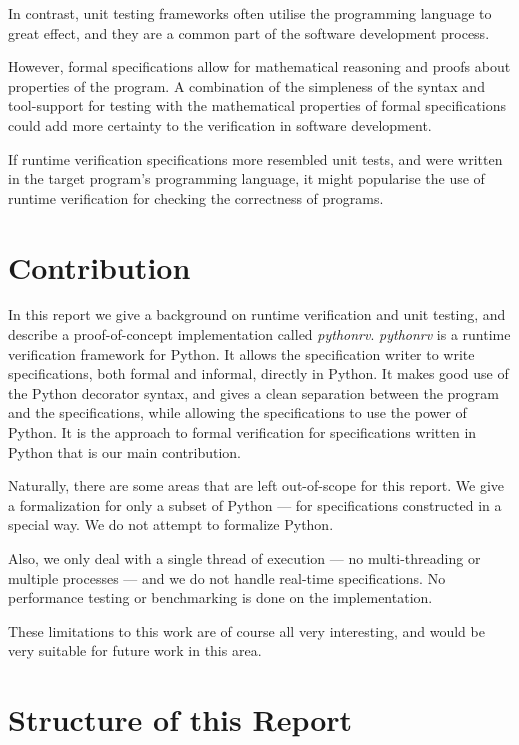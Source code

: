 \documentclass[a4paper,11pt]{kth-mag}
\begin{document}
In contrast, unit testing frameworks often utilise the programming language to
great effect, and they are a common part of the software development process.

However, formal specifications allow for mathematical reasoning and proofs
about properties of the program. A combination of the simpleness of the syntax
and tool-support for testing with the mathematical properties of formal
specifications could add more certainty to the verification in software
development.

If runtime verification specifications more resembled unit tests, and were
written in the target program's programming language, it might popularise the
use of runtime verification for checking the correctness of programs.


\section{Contribution}

In this report we give a background on runtime verification and unit testing,
and describe a proof-of-concept implementation called \textit{pythonrv}.
\textit{pythonrv} is a runtime verification framework for Python. It allows the
specification writer to write specifications, both formal and informal,
directly in Python. It makes good use of the Python decorator syntax, and gives
a clean separation between the program and the specifications, while allowing
the specifications to use the power of Python. It is the approach to formal
verification for specifications written in Python that is our main
contribution.

Naturally, there are some areas that are left out-of-scope for this report. We
give a formalization for only a subset of Python --- for specifications
constructed in a special way. We do not attempt to formalize Python.

Also, we only deal with a single thread of execution --- no multi-threading or
multiple processes --- and we do not handle real-time specifications. No
performance testing or benchmarking is done on the implementation.

These limitations to this work are of course all very interesting, and would be
very suitable for future work in this area.


\section{Structure of this Report}
\end{document}

